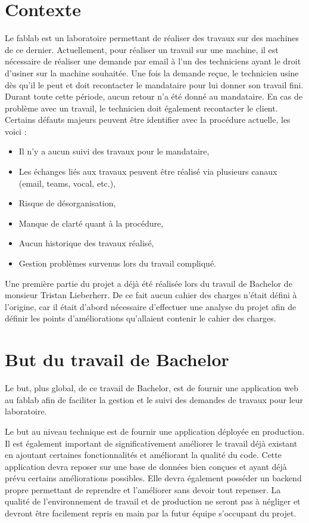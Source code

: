 \documentclass[
    iai, %
    il, %
]{heig-tb}
\begin{document}
\section{Contexte}
Le \Gls{fablab} est un laboratoire permettant de réaliser des travaux sur des machines de ce dernier. Actuellement, pour réaliser un travail sur une machine, il est nécessaire de réaliser une demande par email à l'un des techniciens ayant le droit d'usiner sur la machine souhaitée. Une fois la demande reçue, le technicien usine dès qu'il le peut et doit recontacter le mandataire pour lui donner son travail fini. Durant toute cette période, aucun retour n'a été donné au mandataire. En cas de problème avec un travail, le technicien doit également recontacter le client.\newline
Certains défauts majeurs peuvent être identifier avec la procédure actuelle, les voici :
\begin{itemize}
    \item Il n'y a aucun suivi des travaux pour le mandataire, \cite{lieberherr}
    \item Les échanges liés aux travaux peuvent être réalisé via plusieurs canaux (email, \Gls{teams}, vocal, etc.), \cite{lieberherr}
    \item Risque de désorganisation, \cite{lieberherr}
    \item Manque de clarté quant à la procédure, \cite{lieberherr}
    \item Aucun historique des travaux réalisé,
    \item Gestion problèmes survenus lors du travail compliqué.
\end{itemize}
Une première partie du projet a déjà été réalisée lors du travail de Bachelor de monsieur Tristan Lieberherr. De ce fait aucun cahier des charges n'était défini à l'origine, car il était d'abord nécessaire d'effectuer une analyse du projet afin de définir les points d'améliorations qu'allaient contenir le cahier des charges.

\section{But du travail de Bachelor}
Le but, plus global, de ce travail de Bachelor, est de fournir une application web au fablab afin de faciliter la gestion et le suivi des demandes de travaux pour leur laboratoire.

Le but au niveau technique est de fournir une application déployée en production.\newline
Il est également important de significativement améliorer le travail déjà existant en ajoutant certaines fonctionnalités et améliorant la qualité du code.\newline
Cette application devra reposer sur une base de données bien conçues et ayant déjà prévu certains améliorations possibles. Elle devra également posséder un backend propre permettant de reprendre et l'améliorer sans devoir tout repenser.\newline
La qualité de l'environnement de travail et de production ne seront pas à négliger et devront être facilement repris en main par la futur équipe s'occupant du projet.
\end{document}
